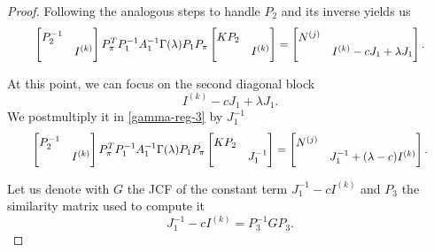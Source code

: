 \begin{proof}
    Following the analogous steps to handle \(P_{2}\) and its inverse yields us
    \begin{gather}
        \scalemath{0.92}{
            \begin{bmatrix}
                P_{2}^{-1} & \\
                & I^{(k)}
            \end{bmatrix}
            P_{\pi}^T P_{1}^{-1} A_{1}^{-1} \Gamma(\lambda) P_{1} P_{\pi}
            \begin{bmatrix}
                KP_{2} & \\
                & I^{(k)}
            \end{bmatrix} =
            \begin{bmatrix}
                N^{(j)} & \\
                & I^{(k)} - cJ_{1} + \lambda J_{1} 
            \end{bmatrix}. \label{gamma-reg-3}
        }
    \end{gather}

    At this point, we can focus on the second diagonal block
    \[
        I^{(k)} - cJ_{1} + \lambda J_{1}.
    \]
    We postmultiply it in
    \eqref{gamma-reg-3} by \(J_{1}^{-1}\)
    \begin{gather}
        \scalemath{0.92}{
            \begin{bmatrix}
                P_{2}^{-1} & \\
                & I^{(k)}
            \end{bmatrix}
            P_{\pi}^T P_{1}^{-1} A_{1}^{-1} \Gamma(\lambda) P_{1} P_{\pi}
            \begin{bmatrix}
                KP_{2} & \\
                & J_{1}^{-1}
            \end{bmatrix} =
            \begin{bmatrix}
                N^{(j)} & \\
                & J_{1}^{-1} + (\lambda - c)I^{(k)} 
            \end{bmatrix}.
        }
    \end{gather}

    Let us denote with \(G\) the JCF of the constant term \(J_{1}^{-1} - cI^{(k)}\) and \(P_{3}\) the similarity matrix
    used to compute it
    \[
        J_{1}^{-1} - cI^{(k)} = P_{3}^{-1}GP_{3}.
    \]


\end{proof}
